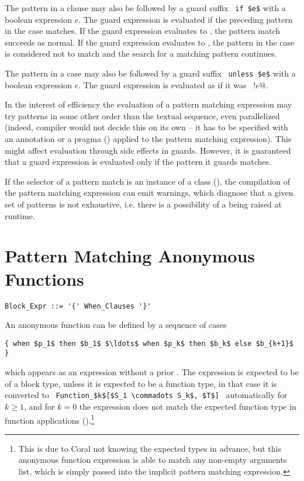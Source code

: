 The pattern in a  clause may also be followed by a guard suffix ~\lstinline!if $e$! with a boolean expression $e$. The guard expression is evaluated if the preceding pattern in the case matches. If the guard expression evaluates to , the pattern match succeeds as normal. If the guard expression evaluates to , the pattern in the case is considered not to match and the search for a matching pattern continues. 

The pattern in a case may also be followed by a guard suffix ~\lstinline!unless $e$! with a boolean expression $e$. The guard expression is evaluated as if it was ~\lstinline@if !$e$@. 

In the interest of efficiency the evaluation of a pattern matching expression may try patterns in some other order than the textual sequence, even parallelized (indeed, compiler would not decide this on its own -- it has to be specified with an annotation or a pragma () applied to the pattern matching expression). This might affect evaluation through side effects in guards. However, it is guaranteed that a guard expression is evaluated only if the pattern it guards matches.

If the selector of a pattern match is an instance of a  class (), the compilation of the pattern matching expression can emit warnings, which diagnose that a given set of patterns is not exhaustive, i.e. there is a possibility of a  being raised at runtime. 






\section{Pattern Matching Anonymous Functions}
\label{sec:pattern-matching-anon-fun}

\syntax\begin{lstlisting}
Block_Expr ::= '{' When_Clauses '}'
\end{lstlisting}

An anonymous function can be defined by a sequence of cases
\begin{lstlisting}
{ when $p_1$ then $b_1$ $\ldots$ when $p_k$ then $b_k$ else $b_{k+1}$ }
\end{lstlisting}
which appears as an expression without a prior . The expression is expected to be of a block type, unless it is expected to be a function type, in that case it is converted to ~\lstinline!Function_$k$[$S_1 \commadots S_k$, $T$]!~ automatically for $k \geq 1$, and for $k = 0$ the expression does not match the expected function type in function applications ().\footnote{This is due to Coral not knowing the expected types in advance, but this anonymous function expression is able to match any non-empty arguments list, which is simply passed into the implicit pattern matching expression.} 

